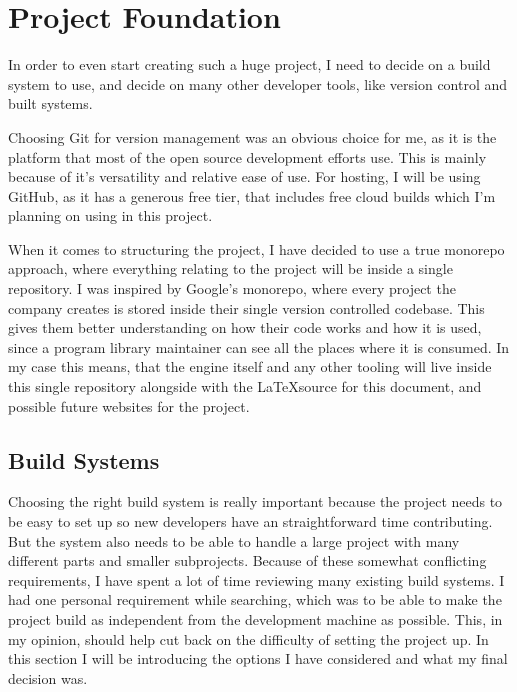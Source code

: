 \chapter{Project Foundation}\label{chap:project-setup}

In order to even start creating such a huge project, I need to decide on a build system to use, and decide on many other developer tools, like version control and built systems.

Choosing Git for version management was an obvious choice for me, as it is the platform that most of the open source development efforts use. This is mainly because of it's versatility and relative ease of use. For hosting, I will be using GitHub, as it has a generous free tier, that includes free cloud builds which I'm planning on using in this project.

When it comes to structuring the project, I have decided to use a true monorepo approach, where everything relating to the project will be inside a single repository. I was inspired by Google's monorepo, where every project the company creates is stored inside their single version controlled codebase. This gives them better understanding on how their code works and how it is used, since a program library maintainer can see all the places where it is consumed. In my case this means, that the engine itself and any other tooling will live inside this single repository alongside with the \LaTeX source for this document, and possible future websites for the project.


\section{Build Systems}

Choosing the right build system is really important because the project needs to be easy to set up so new developers have an straightforward time contributing. But the system also needs to be able to handle a large project with many different parts and smaller subprojects. Because of these somewhat conflicting requirements, I have spent a lot of time reviewing many existing build systems. I had one personal requirement while searching, which was to be able to make the project build as independent from the development machine as possible. This, in my opinion, should help cut back on the difficulty of setting the project up. In this section I will be introducing the options I have considered and what my final decision was.


